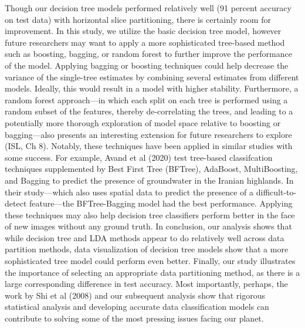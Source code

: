 \documentclass[12pt]{article}
\begin{document}
Though our decision tree models performed relatively well (91 percent accuracy on test data) with horizontal slice partitioning, there is certainly room for improvement. In this study, we utilize the basic decision tree model, however future researchers may want to apply a more sophisticated tree-based method such as boosting, bagging, or random forest to further improve the performance of the model. Applying bagging or boosting techniques could help decrease the variance of the single-tree estimates by combining several estimates from different models. Ideally, this would result in a model with higher stability. Furthermore, a random forest approach---in which each split on each tree is performed using a random subset of the features, thereby de-correlating the trees, and leading to a potentially more thorough exploration of model space relative to boosting or bagging---also presents an interesting extension for future researchers to explore  (ISL, Ch 8). Notably, these techniques have been applied in similar studies with some success. For example, Avand et al (2020) test tree-based classifcation techniques supplemented by Best First Tree (BFTree), AdaBoost, MultiBoosting, and Bagging to predict the presence of groundwater in the Iranian highlands. In their study---which also uses spatial data to predict the presence of a difficult-to-detect feature---the BFTree-Bagging model had the best performance. Applying these techniques may also help decision tree classifiers perform better in the face of new images without any ground truth.    
\newline
\newline
In conclusion, our analysis shows that while decision tree and LDA methods appear to do relatively well across data partition methods, data visualization of decision tree models show that a more sophisticated tree model could perform even better. Finally, our study illustrates the importance of selecting an appropriate data partitioning method, as there is a large corresponding difference in test accuracy. Most importantly, perhaps, the work by Shi et al (2008) and our subsequent analysis show that rigorous statistical analysis and developing accurate data classification models can contribute to solving some of the most pressing issues facing our planet. 
\end{document}
